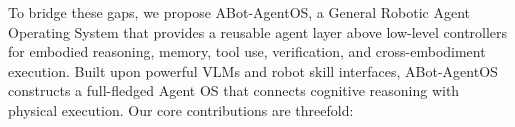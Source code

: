 

To bridge these gaps, we propose ABot-AgentOS, a General Robotic Agent Operating System that provides a reusable agent layer  above low-level controllers for embodied reasoning, memory, tool use, verification, and cross-embodiment execution. Built upon powerful VLMs and robot skill interfaces, ABot-AgentOS constructs a full-fledged Agent OS that connects cognitive reasoning with physical execution. Our core contributions are threefold:

